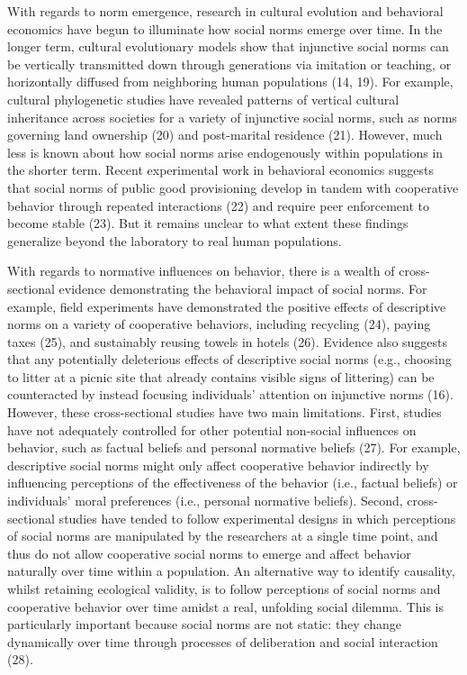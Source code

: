 \documentclass[
  man,floatsintext]{apa6}
\begin{document}
With regards to norm emergence, research in cultural evolution and behavioral economics have begun to illuminate how social norms emerge over time. In the longer term, cultural evolutionary models show that injunctive social norms can be vertically transmitted down through generations via imitation or teaching, or horizontally diffused from neighboring human populations (14, 19). For example, cultural phylogenetic studies have revealed patterns of vertical cultural inheritance across societies for a variety of injunctive social norms, such as norms governing land ownership (20) and post-marital residence (21). However, much less is known about how social norms arise endogenously within populations in the shorter term. Recent experimental work in behavioral economics suggests that social norms of public good provisioning develop in tandem with cooperative behavior through repeated interactions (22) and require peer enforcement to become stable (23). But it remains unclear to what extent these findings generalize beyond the laboratory to real human populations.

With regards to normative influences on behavior, there is a wealth of cross-sectional evidence demonstrating the behavioral impact of social norms. For example, field experiments have demonstrated the positive effects of descriptive norms on a variety of cooperative behaviors, including recycling (24), paying taxes (25), and sustainably reusing towels in hotels (26). Evidence also suggests that any potentially deleterious effects of descriptive social norms (e.g., choosing to litter at a picnic site that already contains visible signs of littering) can be counteracted by instead focusing individuals' attention on injunctive norms (16). However, these cross-sectional studies have two main limitations. First, studies have not adequately controlled for other potential non-social influences on behavior, such as factual beliefs and personal normative beliefs (27). For example, descriptive social norms might only affect cooperative behavior indirectly by influencing perceptions of the effectiveness of the behavior (i.e., factual beliefs) or individuals' moral preferences (i.e., personal normative beliefs). Second, cross-sectional studies have tended to follow experimental designs in which perceptions of social norms are manipulated by the researchers at a single time point, and thus do not allow cooperative social norms to emerge and affect behavior naturally over time within a population. An alternative way to identify causality, whilst retaining ecological validity, is to follow perceptions of social norms and cooperative behavior over time amidst a real, unfolding social dilemma. This is particularly important because social norms are not static: they change dynamically over time through processes of deliberation and social interaction (28).
\end{document}
